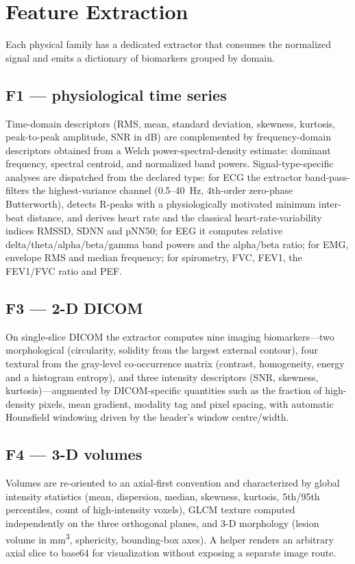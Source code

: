 \documentclass[conference]{IEEEtran}
\begin{document}
\section{Feature Extraction}
Each physical family has a dedicated extractor that consumes the normalized
signal and emits a dictionary of biomarkers grouped by domain.

\subsection{F1 --- physiological time series}
Time-domain descriptors (RMS, mean, standard deviation, skewness, kurtosis,
peak-to-peak amplitude, SNR in dB) are complemented by frequency-domain
descriptors obtained from a Welch power-spectral-density estimate: dominant
frequency, spectral centroid, and normalized band powers. Signal-type-specific
analyses are dispatched from the declared type: for ECG the extractor
band-pass-filters the highest-variance channel (0.5--40~Hz, 4th-order
zero-phase Butterworth), detects R-peaks with a physiologically motivated
minimum inter-beat distance, and derives heart rate and the classical
heart-rate-variability indices RMSSD, SDNN and pNN50; for EEG it computes
relative delta/theta/alpha/beta/gamma band powers and the alpha/beta ratio; for
EMG, envelope RMS and median frequency; for spirometry, FVC, FEV1, the
FEV1/FVC ratio and PEF.

\subsection{F3 --- 2-D DICOM}
On single-slice DICOM the extractor computes nine imaging biomarkers---two
morphological (circularity, solidity from the largest external contour), four
textural from the gray-level co-occurrence matrix (contrast, homogeneity,
energy and a histogram entropy), and three intensity descriptors (SNR,
skewness, kurtosis)---augmented by DICOM-specific quantities such as the
fraction of high-density pixels, mean gradient, modality tag and pixel spacing,
with automatic Hounsfield windowing driven by the header's window
centre/width.

\subsection{F4 --- 3-D volumes}
Volumes are re-oriented to an axial-first convention and characterized by global
intensity statistics (mean, dispersion, median, skewness, kurtosis, 5th/95th
percentiles, count of high-intensity voxels), GLCM texture computed
independently on the three orthogonal planes, and 3-D morphology (lesion volume
in mm\textsuperscript{3}, sphericity, bounding-box axes). A helper renders an
arbitrary axial slice to base64 for visualization without exposing a separate
image route.
\end{document}
